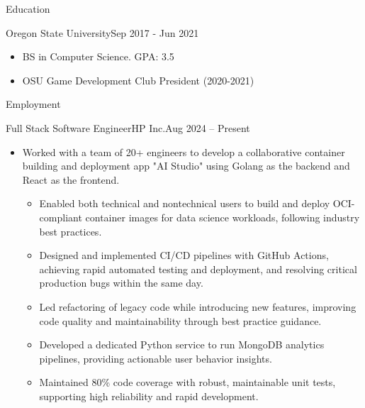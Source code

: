 \documentclass[]{mcdowellcv}
\begin{document}
\makeheader
\vspace{-4pt}

\begin{cvsection}{Education}
	\begin{cvsubsection}{Oregon State University}{}{Sep 2017 - Jun 2021}
        \vspace{-4pt}
		\begin{itemize}
			\item BS in Computer Science. GPA: 3.5
                \item OSU Game Development Club President (2020-2021)
		\end{itemize}
        \vspace{-12pt}
	\end{cvsubsection}
\end{cvsection}
\begin{cvsection}{Employment}
      \begin{cvsubsection}{Full Stack Software Engineer}{HP Inc.}{Aug 2024 -- Present}
    \vspace{-4pt}
		\begin{itemize}%
            \item Worked with a team of 20+ engineers to develop a collaborative container building and deployment app "AI Studio" using Golang as the backend and React as the frontend.
            \begin{itemize}
                \item Enabled both technical and nontechnical users to build and deploy OCI-compliant container images for data science workloads, following industry best practices.
                \item Designed and implemented CI/CD pipelines with GitHub Actions, achieving rapid automated testing and deployment, and resolving critical production bugs within the same day.
                \item Led refactoring of legacy code while introducing new features, improving code quality and maintainability through best practice guidance.
                \item Developed a dedicated Python service to run MongoDB analytics pipelines, providing actionable user behavior insights.
                \item Maintained 80\% code coverage with robust, maintainable unit tests, supporting high reliability and rapid development.
            \end{itemize}
		  \end{itemize}

\end{cvsubsection}
\end{cvsection}
\end{document}
